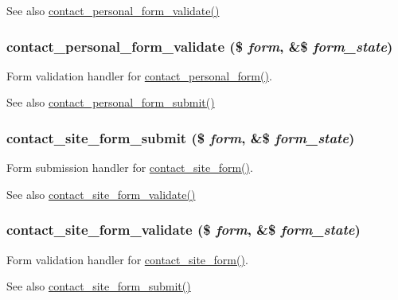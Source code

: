 \begin{DoxySeeAlso}{See also}
\hyperlink{contact_8pages_8inc_aae358ed0604f1e51cb6d1a1e830f81fd}{contact\_\-personal\_\-form\_\-validate()} 
\end{DoxySeeAlso}
\hypertarget{contact_8pages_8inc_aae358ed0604f1e51cb6d1a1e830f81fd}{
\subsubsection[{contact\_\-personal\_\-form\_\-validate}]{\setlength{\rightskip}{0pt plus 5cm}contact\_\-personal\_\-form\_\-validate (\$ {\em form}, \/  \&\$ {\em form\_\-state})}}
\label{contact_8pages_8inc_aae358ed0604f1e51cb6d1a1e830f81fd}
Form validation handler for \hyperlink{group__forms_ga7dfdb8ed0a4456f0f2070b6efd64f280}{contact\_\-personal\_\-form()}.

\begin{DoxySeeAlso}{See also}
\hyperlink{contact_8pages_8inc_a51522c699a24af2fb7fb613c3a0dd6e4}{contact\_\-personal\_\-form\_\-submit()} 
\end{DoxySeeAlso}
\hypertarget{contact_8pages_8inc_a270bdc78a9bbba16b7f4efe1cbe1cc4d}{
\subsubsection[{contact\_\-site\_\-form\_\-submit}]{\setlength{\rightskip}{0pt plus 5cm}contact\_\-site\_\-form\_\-submit (\$ {\em form}, \/  \&\$ {\em form\_\-state})}}
\label{contact_8pages_8inc_a270bdc78a9bbba16b7f4efe1cbe1cc4d}
Form submission handler for \hyperlink{group__forms_gabc4466031f99ab64b6b65e4fdbf4291d}{contact\_\-site\_\-form()}.

\begin{DoxySeeAlso}{See also}
\hyperlink{contact_8pages_8inc_a548e38faaf205c6ac81ad3c91c7f7de1}{contact\_\-site\_\-form\_\-validate()} 
\end{DoxySeeAlso}
\hypertarget{contact_8pages_8inc_a548e38faaf205c6ac81ad3c91c7f7de1}{
\subsubsection[{contact\_\-site\_\-form\_\-validate}]{\setlength{\rightskip}{0pt plus 5cm}contact\_\-site\_\-form\_\-validate (\$ {\em form}, \/  \&\$ {\em form\_\-state})}}
\label{contact_8pages_8inc_a548e38faaf205c6ac81ad3c91c7f7de1}
Form validation handler for \hyperlink{group__forms_gabc4466031f99ab64b6b65e4fdbf4291d}{contact\_\-site\_\-form()}.

\begin{DoxySeeAlso}{See also}
\hyperlink{contact_8pages_8inc_a270bdc78a9bbba16b7f4efe1cbe1cc4d}{contact\_\-site\_\-form\_\-submit()} 
\end{DoxySeeAlso}
